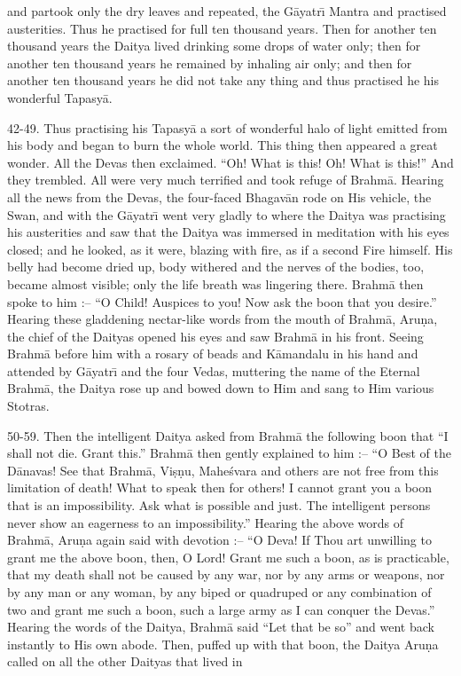 and partook only the dry leaves and repeated, the G\=ayatr\={\i} Mantra and practised austerities. Thus he practised for full ten thousand years. Then for another ten thousand years the Daitya lived drinking some drops of water only; then for another ten thousand years he remained by inhaling air only; and then for another ten thousand years he did not take any thing and thus practised he his wonderful Tapasy\=a.

42-49. Thus practising his Tapasy\=a a sort of wonderful halo of light emitted from his body and began to burn the whole world. This thing then appeared a great wonder. All the Devas then exclaimed. ``Oh! What is this! Oh! What is this!'' And they trembled. All were very much terrified and took refuge of Brahm\=a. Hearing all the news from the Devas, the four-faced Bhagav\=an rode on His vehicle, the Swan, and with the G\=ayatr\={\i} went very gladly to where the Daitya was practising his austerities and saw that the Daitya was immersed in meditation with his eyes closed; and he looked, as it were, blazing with fire, as if a second Fire himself. His belly had become dried up, body withered and the nerves of the bodies, too, became almost visible; only the life breath was lingering there. Brahm\=a then spoke to him :-- ``O Child! Auspices to you! Now ask the boon that you desire.'' Hearing these gladdening nectar-like words from the mouth of Brahm\=a, Aru\d{n}a, the chief of the Daityas opened his eyes and saw Brahm\=a in his front. Seeing Brahm\=a before him with a rosary of beads and K\=amandalu in his hand and attended by G\=ayatr\={\i} and the four Vedas, muttering the name of the Eternal Brahm\=a, the Daitya rose up and bowed down to Him and sang to Him various Stotras.

50-59. Then the intelligent Daitya asked from Brahm\=a the following boon that ``I shall not die. Grant this.'' Brahm\=a then gently explained to him :-- ``O Best of the D\=anavas! See that Brahm\=a, Vi\d{s}\d{n}u, Mahe\'svara and others are not free from this limitation of death! What to speak then for others! I cannot grant you a boon that is an impossibility. Ask what is possible and just. The intelligent persons never show an eagerness to an impossibility.'' Hearing the above words of Brahm\=a, Aru\d{n}a again said with devotion :-- ``O Deva! If Thou art unwilling to grant me the above boon, then, O Lord! Grant me such a boon, as is practicable, that my death shall not be caused by any war, nor by any arms or weapons, nor by any man or any woman, by any biped or quadruped or any combination of two and grant me such a boon, such a large army as I can conquer the Devas.'' Hearing the words of the Daitya, Brahm\=a said ``Let that be so'' and went back instantly to His own abode. Then, puffed up with that boon, the Daitya Aru\d{n}a called on all the other Daityas that lived in


